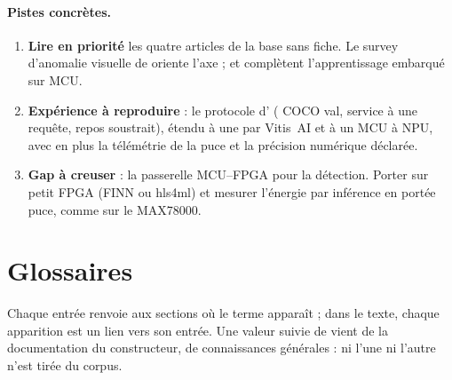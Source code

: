 \documentclass[11pt,a4paper]{article}
\begin{document}
\paragraph{Pistes concrètes.}
\begin{enumerate}
  \item \textbf{Lire en priorité} les quatre articles de la base sans fiche. Le survey
    d'anomalie visuelle de \citet{2023-cui-survey-unsupervised-anomaly-detection-algorithms}
    oriente l'axe  ; \citet{arxiv-2206.15472-device-training-256kb-memory}\pp{}
    et \citet{arxiv-2409.07114-continual-incremental-learning-tinyml-device} complètent
    l'apprentissage embarqué sur MCU.
  \item \textbf{Expérience à reproduire} : le protocole
    d'\citet{arxiv-2409.16808-comprehensive-evaluation-deep-learning-object}\pp{} ( COCO
    val, service à une requête, repos soustrait), étendu à une  par Vitis~AI et à un
    MCU à NPU, avec en plus la télémétrie de la puce et la précision numérique déclarée.
  \item \textbf{Gap à creuser} : la passerelle MCU--FPGA pour la détection. Porter
    \citep{arxiv-2306.00001-tinyissimoyolo-quantized-low-memory-footprint} sur petit FPGA
    (FINN ou hls4ml) et mesurer l'énergie par inférence en portée puce, comme sur le
    MAX78000.
\end{enumerate}

\appendix
\section*{Glossaires}
Chaque entrée renvoie aux sections où le terme apparaît ; dans le texte, chaque apparition
est un lien vers son entrée. Une valeur suivie de \constr{} vient de la documentation du
constructeur, \horscorpus{} de connaissances générales : ni l'une ni l'autre n'est tirée du
corpus.
\printglossary[type=plateformes]
\printglossary[type=modeles]
\printglossary[type=metriques]



\end{document}
